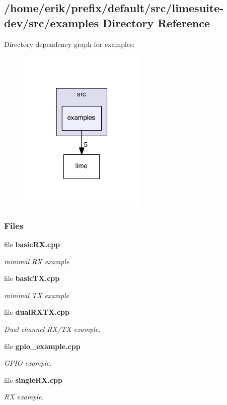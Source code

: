\subsection{/home/erik/prefix/default/src/limesuite-\/dev/src/examples Directory Reference}
\label{dir_516d3e2cb59c5a4e3ebefe88f75a97a6}
Directory dependency graph for examples\+:
\nopagebreak
\begin{figure}[H]
\begin{center}
\leavevmode
\includegraphics[width=172pt]{dir_516d3e2cb59c5a4e3ebefe88f75a97a6_dep}
\end{center}
\end{figure}
\subsubsection*{Files}
\begin{DoxyCompactItemize}
\item 
file {\bf basic\+R\+X.\+cpp}
\begin{DoxyCompactList}\small\item\em minimal RX example \end{DoxyCompactList}\item 
file {\bf basic\+T\+X.\+cpp}
\begin{DoxyCompactList}\small\item\em minimal TX example \end{DoxyCompactList}\item 
file {\bf dual\+R\+X\+T\+X.\+cpp}
\begin{DoxyCompactList}\small\item\em Dual channel R\+X/\+TX example. \end{DoxyCompactList}\item 
file {\bf gpio\+\_\+example.\+cpp}
\begin{DoxyCompactList}\small\item\em G\+P\+IO example. \end{DoxyCompactList}\item 
file {\bf single\+R\+X.\+cpp}
\begin{DoxyCompactList}\small\item\em RX example. \end{DoxyCompactList}\end{DoxyCompactItemize}
